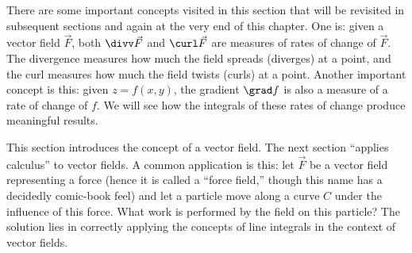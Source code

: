 There are some important concepts visited in this section that will be revisited in subsequent sections and again at the very end of this chapter. One is: given a vector field $\vec F$, both $\divv\vec F$ and $\curl\vec F$ are measures of rates of change of $\vec F$. The divergence measures how much the field spreads (diverges) at a point, and the curl measures how much the field twists (curls) at a point. Another important concept is this: given $z=f(x,y)$, the gradient $\grad f$ is also a measure of a rate of change of $f$. We will see how the integrals of these rates of change produce meaningful results.

This section introduces the concept of a vector field. The next section ``applies calculus'' to vector fields. A common application is this: let $\vec F$ be a vector field representing a force (hence it is called a ``force field,'' though this name has a decidedly comic-book feel) and let a particle move along a curve $C$ under the influence of this force. What work is performed by the field on this particle? The solution lies in correctly applying the concepts of line integrals in the context of vector fields.


